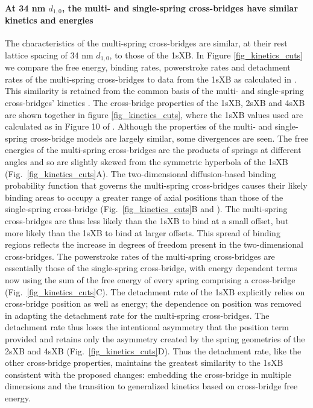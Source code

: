 \documentclass[]{article}
\begin{document}
\paragraph{At 34 nm $d_{1,0}$, the multi- and single-spring cross-bridges have similar kinetics and energies} %
The characteristics of the multi-spring cross-bridges are similar, at their rest lattice spacing of 34 nm $d_{1,0}$, to those of the 1sXB.
In Figure \ref{fig_kinetics_cuts} we compare the free energy, binding rates, powerstroke rates and detachment rates of the multi-spring cross-bridges to data from the 1sXB as calculated in \citet{Tanner2007}. 
This similarity is retained from the common basis of the multi- and single-spring cross-bridges' kinetics \citep{Pate1989}.
The cross-bridge properties of the 1sXB, 2sXB and 4sXB are shown together in figure \ref{fig_kinetics_cuts}, where the 1sXB values used are calculated as in Figure 10 of \citet{Tanner2007}. 
Although the properties of the multi- and single-spring cross-bridge models are largely similar, some divergences are seen. 
The free energies of the multi-spring cross-bridges are the products of springs at different angles and so are slightly skewed from the symmetric hyperbola of the 1sXB  (Fig.~\ref{fig_kinetics_cuts}A).
The two-dimensional diffusion-based binding probability function that governs the multi-spring cross-bridges causes their likely binding areas to occupy a greater range of axial positions than those of the single-spring cross-bridge (Fig.~\ref{fig_kinetics_cuts}B and \citet{BergBook, DillBook}).
The multi-spring cross-bridges are thus less likely than the 1sXB to bind at a small offset, but more likely than the 1sXB to bind at larger offsets. 
This spread of binding regions reflects the increase in degrees of freedom present in the two-dimensional cross-bridges. 
The powerstroke rates of the multi-spring cross-bridges are essentially those of the single-spring cross-bridge, with energy dependent terms now using the  sum of the free energy of every spring comprising a cross-bridge  (Fig.~\ref{fig_kinetics_cuts}C). 
The detachment rate of the 1sXB explicitly relies on cross-bridge position as well as energy; the dependence on position was removed in adapting the detachment rate for the multi-spring cross-bridges. 
The detachment rate thus loses the intentional asymmetry that the position term provided and retains only the asymmetry created by the spring geometries of the 2sXB and 4sXB (Fig.~\ref{fig_kinetics_cuts}D). 
Thus the detachment rate, like the other cross-bridge properties, maintains the greatest similarity to the 1sXB consistent with the proposed changes: embedding the cross-bridge in multiple dimensions and the transition to generalized kinetics based on cross-bridge free energy. 
\end{document}
